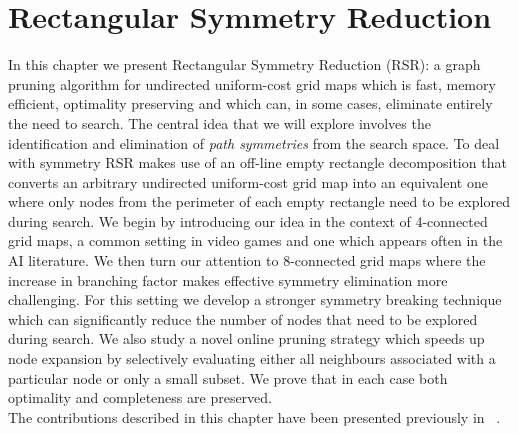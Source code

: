 \chapter{Rectangular Symmetry Reduction}
\label{cha:rsr}
In this chapter we present Rectangular Symmetry Reduction (RSR): a graph pruning
algorithm for undirected uniform-cost grid maps which is fast, memory efficient,
optimality preserving and which can, in some cases, eliminate entirely the need
to search.  The central idea that we will explore involves the identification
and elimination of \emph{path symmetries} from the search space. 
To deal with symmetry RSR makes use of an off-line
empty rectangle decomposition that converts an arbitrary
undirected uniform-cost grid map into an equivalent one where only nodes
from the perimeter of each empty rectangle need to be explored during search.
We begin by introducing our idea in the context of 4-connected grid maps, a common
setting in video games and one which appears often in the AI literature.
We then turn our attention to 8-connected grid maps where the increase in
branching factor makes effective symmetry elimination more challenging. 
For this setting we develop a stronger symmetry breaking technique which can significantly
reduce the number of nodes that need to be explored during search. We also study a novel 
online pruning strategy which speeds up node expansion by selectively evaluating either 
all neighbours associated with a particular node or only a small subset.  
We prove that in each case both optimality and completeness are preserved.
\\ \newline
The contributions described in this chapter have been presented previously in
~\cite{harabor10, harabor11a, harabor11c}.

